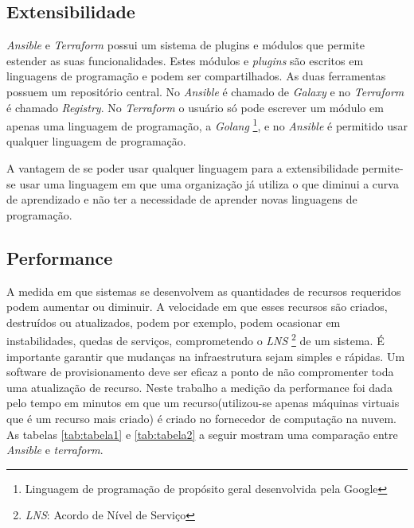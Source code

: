 \subsection{Extensibilidade}

\textit{Ansible} e \textit{Terraform} possui um sistema de plugins e módulos que permite estender as suas funcionalidades. Estes módulos e \textit{plugins} são escritos em linguagens de programação e podem ser compartilhados. As duas ferramentas possuem um repositório central. No \textit{Ansible} é chamado de \textit{Galaxy} e no \textit{Terraform} é chamado \textit{Registry}. No \textit{Terraform} o usuário só pode escrever um módulo em apenas uma linguagem de programação, a \textit{Golang}  \footnote{Linguagem de programação de propósito geral desenvolvida pela Google}, e no \textit{Ansible} é permitido usar qualquer linguagem de programação.  

A vantagem de se poder usar qualquer linguagem para a extensibilidade permite-se usar uma linguagem em que uma organização já utiliza o que diminui a curva de aprendizado e não ter a necessidade de aprender novas linguagens de programação.  

\subsection{Performance}
A medida em que sistemas se desenvolvem as quantidades de recursos requeridos podem aumentar ou diminuir. A velocidade em que esses recursos são criados, destruídos ou atualizados, podem por exemplo, podem ocasionar em instabilidades, quedas de serviços, comprometendo o \textit{LNS} \footnote{ \textit{LNS}: Acordo de Nível de Serviço} de um sistema. É importante garantir que mudanças na infraestrutura sejam simples e rápidas. Um software de provisionamento deve ser eficaz a ponto de não compromenter toda uma atualização de recurso. Neste trabalho a medição da performance foi dada pelo tempo em minutos em que um recurso(utilizou-se apenas máquinas virtuais que é um recurso mais criado) é criado no fornecedor de computação na nuvem. As tabelas \ref{tab:tabela1} e \ref{tab:tabela2} a seguir mostram uma comparação entre \textit{Ansible} e \textit{terraform}. 


